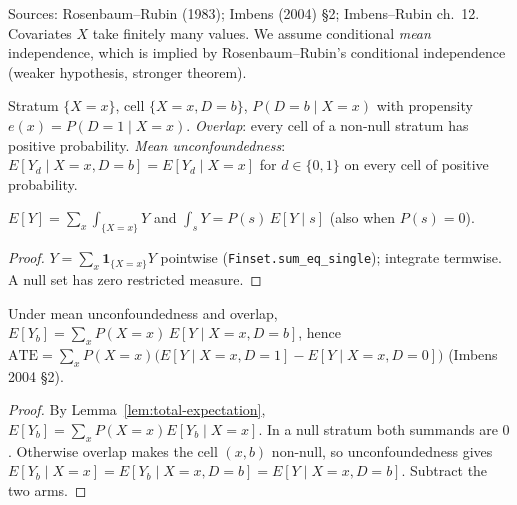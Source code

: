 Sources: Rosenbaum--Rubin (1983); Imbens (2004) \S2; Imbens--Rubin ch.~12. Covariates $X$ take finitely many
values. We assume conditional \emph{mean} independence, which is implied by Rosenbaum--Rubin's conditional
independence (weaker hypothesis, stronger theorem).

\begin{definition}
\label{def:unconfoundedness}
\leanok
{}
Stratum $\{X = x\}$, cell $\{X = x, D = b\}$, $P(D = b\mid X = x)$ with propensity $e(x) = P(D=1\mid X=x)$.
\emph{Overlap}: every cell of a non-null stratum has positive probability. \emph{Mean unconfoundedness}:
$E[Y_d \mid X=x, D=b] = E[Y_d \mid X = x]$ for $d \in\{0,1\}$ on every cell of positive probability.
\end{definition}

\begin{lemma}
\label{lem:total-expectation}
\leanok
{}
$E[Y] = \sum_x \int_{\{X=x\}} Y$ and $\int_s Y = P(s)\,E[Y\mid s]$ (also when $P(s) = 0$).
\end{lemma}
\begin{proof}
\leanok
$Y = \sum_x \mathbf 1_{\{X = x\}} Y$ pointwise (\texttt{Finset.sum\_eq\_single}); integrate termwise. A null set has
zero restricted measure.
\end{proof}

\begin{theorem}
\label{thm:adjustment}
\leanok
{}
Under mean unconfoundedness and overlap, $E[Y_b] = \sum_x P(X=x)\,E[Y \mid X=x, D=b]$, hence
$\mathrm{ATE} = \sum_x P(X=x)\big(E[Y\mid X=x,D=1] - E[Y\mid X=x,D=0]\big)$ (Imbens 2004 \S2).
\end{theorem}
\begin{proof}
\leanok
{}
By Lemma~\ref{lem:total-expectation}, $E[Y_b] = \sum_x P(X=x)E[Y_b\mid X=x]$. In a null stratum both summands are
$0$. Otherwise overlap makes the cell $(x,b)$ non-null, so unconfoundedness gives
$E[Y_b \mid X=x] = E[Y_b\mid X=x, D=b] = E[Y\mid X=x,D=b]$. Subtract the two arms.
\end{proof}

